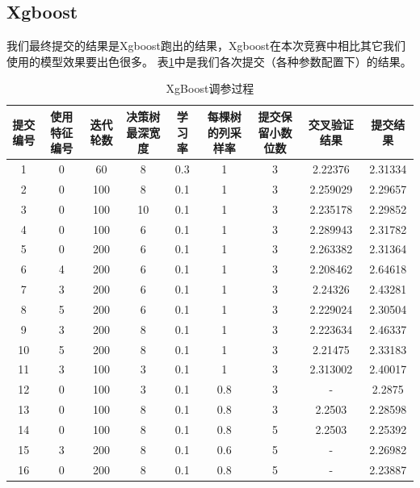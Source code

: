 \subsection{Xgboost}

我们最终提交的结果是Xgboost跑出的结果，Xgboost在本次竞赛中相比其它我们使用的模型效果要出色很多。
表\ref{tb:xgboost}中是我们各次提交（各种参数配置下）的结果。

\begin{table}[tb]
    \centering
    \caption{XgBoost调参过程}
    \begin{tabular}{|c|c|c|c|c|c|c|c|c|}
    \hline
    提交编号 & 使用特征编号 & 迭代轮数 & 决策树最深宽度 & 学习率 & 每棵树的列采样率 & 提交保留小数位数 & 交叉验证结果 & 提交结果 \\
    \hline
    1 & 0 & 60 & 8 & 0.3 & 1 & 3 & 2.22376 & 2.31334 \\
    \hline
    2 & 0 & 100 & 8 & 0.1 & 1 & 3 & 2.259029 & 2.29657 \\
    \hline
    3 & 0 & 100 & 10 & 0.1 & 1 & 3 & 2.235178 & 2.29852 \\
    \hline
    4 & 0 & 100 & 6 & 0.1 & 1 & 3 & 2.289943 & 2.31782 \\
    \hline
    5 & 0 & 200 & 6 & 0.1 & 1 & 3 & 2.263382 & 2.31364 \\
    \hline
    6 & 4 & 200 & 6 & 0.1 & 1 & 3 & 2.208462 & 2.64618 \\
    \hline
    7 & 3 & 200 & 6 & 0.1 & 1 & 3 & 2.24326 & 2.43281 \\
    \hline
    8 & 5 & 200 & 6 & 0.1 & 1 & 3 & 2.229024 & 2.30504 \\
    \hline
    9 & 3 & 200 & 8 & 0.1 & 1 & 3 & 2.223634 & 2.46337 \\
    \hline
    10 & 5 & 200 & 8 & 0.1 & 1 & 3 & 2.21475 & 2.33183 \\
    \hline
    11 & 3 & 100 & 3 & 0.1 & 1 & 3 & 2.313002 & 2.40017 \\
    \hline
    12 & 0 & 100 & 3 & 0.1 & 0.8 & 3 & - & 2.2875 \\
    \hline
    13 & 0 & 100 & 8 & 0.1 & 0.8 & 3 & 2.2503 & 2.28598 \\
    \hline
    14 & 0 & 100 & 8 & 0.1 & 0.8 & 5 & 2.2503 & 2.25392 \\
    \hline
    15 & 3 & 200 & 8 & 0.1 & 0.6 & 5 & - & 2.26982 \\
    \hline
    16 & 0 & 200 & 8 & 0.1 & 0.8 & 5 & - & 2.23887 \\
    \hline
    \end{tabular}
\label{tb:xgboost}
\end{table}

